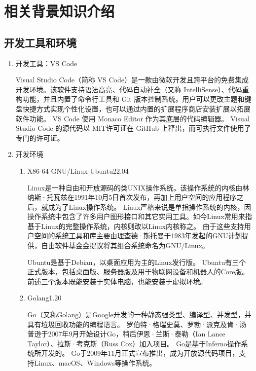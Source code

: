 \section{相关背景知识介绍}

	\subsection{开发工具和环境}
  
  	\begin{enumerate}[fullwidth,itemindent=2em,listparindent=2em]

  		\item 开发工具：VS Code
  		
		Visual Studio Code（简称 VS Code）是一款由微软开发且跨平台的免费集成开发环境。该软件支持语法高亮、代码自动补全（又称 IntelliSense）、代码重构功能，并且内置了命令行工具和 Git 版本控制系统。用户可以更改主题和键盘快捷方式实现个性化设置，也可以通过内置的扩展程序商店安装扩展以拓展软件功能。
		VS Code 使用 Monaco Editor 作为其底层的代码编辑器。
		Visual Studio Code 的源代码以 MIT许可证在 GitHub 上释出，而可执行文件使用了专门的许可证。
			
		\item 开发环境
			\begin{enumerate}
				\item X86-64 GNU/Linux-Ubuntu22.04
				
				Linux是一种自由和开放源码的类UNIX操作系统。该操作系统的内核由林纳斯·托瓦兹在1991年10月5日首次发布，再加上用户空间的应用程序之后，就成为了Linux操作系统。
				Linux严格来说是单指操作系统的内核，因操作系统中包含了许多用户图形接口和其它实用工具。如今Linux常用来指基于Linux的完整操作系统，内核则改以Linux内核称之。
				由于这些支持用户空间的系统工具和库主要由理查德·斯托曼于1983年发起的GNU计划提供，自由软件基金会提议将其组合系统命名为GNU/Linux。
				
				Ubuntu是基于Debian，以桌面应用为主的Linux发行版。
				Ubuntu有三个正式版本，包括桌面版、服务器版及用于物联网设备和机器人的Core版。
				前述三个版本既能安装于实体电脑，也能安装于虚拟环境。
				
				\item Golang1.20
				
				Go（又称Golang）是Google开发的一种静态强类型、编译型、并发型，并具有垃圾回收功能的编程语言。
				罗伯特·格瑞史莫、罗勃·派克及肯·汤普逊于2007年9月开始设计Go，稍后伊恩·兰斯·泰勒（Ian Lance Taylor）、拉斯·考克斯（Russ Cox）加入项目。
				Go是基于Inferno操作系统所开发的。
				Go于2009年11月正式宣布推出，成为开放源代码项目，支持Linux、macOS、Windows等操作系统。
			

\end{enumerate}
\end{enumerate}

